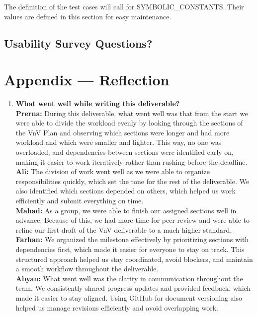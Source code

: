 \documentclass[12pt, titlepage]{article}
\begin{document}
The definition of the test cases will call for SYMBOLIC\_CONSTANTS.
Their values are defined in this section for easy maintenance.

\subsection{Usability Survey Questions?}


\newpage{}
\section*{Appendix --- Reflection}

\begin{enumerate}
  \item \textbf{What went well while writing this deliverable?} \\[3pt]
  \textbf{Prerna:} During this deliverable, what went well was that from the start we were able to divide the workload evenly by looking through the sections of the VnV Plan and observing which sections were longer and had more workload and which were smaller and lighter. This way, no one was overloaded, and dependencies between sections were identified early on, making it easier to work iteratively rather than rushing before the deadline.\\[5pt]
  \textbf{Ali:} The division of work went well as we were able to organize responsibilities quickly, which set the tone for the rest of the deliverable. We also identified which sections depended on others, which helped us work efficiently and submit everything on time.\\[5pt]
  \textbf{Mahad:} As a group, we were able to finish our assigned sections well in advance. Because of this, we had more time for peer review and were able to refine our first draft of the VnV deliverable to a much higher standard.\\[5pt]
  \textbf{Farhan:} We organized the milestone effectively by prioritizing sections with dependencies first, which made it easier for everyone to stay on track. This structured approach helped us stay coordinated, avoid blockers, and maintain a smooth workflow throughout the deliverable.\\[5pt]
  \textbf{Abyan:} What went well was the clarity in communication throughout the team. We consistently shared progress updates and provided feedback, which made it easier to stay aligned. Using GitHub for document versioning also helped us manage revisions efficiently and avoid overlapping work.


\end{enumerate}
\end{document}
